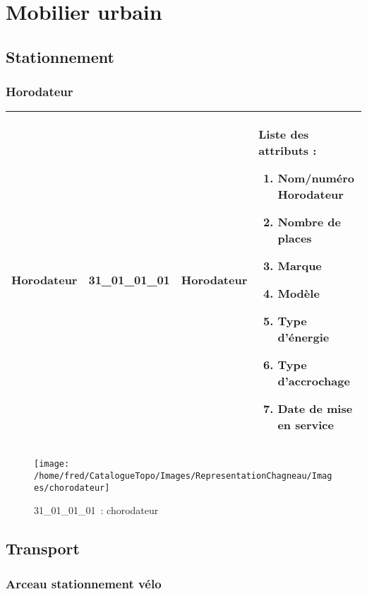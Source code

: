 \documentclass[12pt,titlepage]{book}
\begin{document}
\chapter{Mobilier urbain}
\section{\large Stationnement}
\subsection{Horodateur}
\noindent
\vspace{\baselineskip}

\renewcommand{\arraystretch}{1.2}
\begin{supertabular}{|p{10cm}|c|p{13cm}|p{12cm}|}
 Horodateur & 31\_01\_01\_01 & Horodateur & Liste des attributs :
\begin{enumerate}
  \item Nom/numéro Horodateur  \item Nombre de places  \item Marque  \item Modèle  \item Type d'énergie  \item Type d'accrochage  \item Date de mise en service\end{enumerate}
\\
\hline
\end{supertabular}
\begin{figure}[h!]
  \hfill         %
  \begin{minipage}[t]{3cm}
    \begin{center}
      \texttt{[image: /home/fred/CatalogueTopo/Images/RepresentationChagneau/Images/chorodateur]}
      \caption[~31\_01\_01\_01]{\small{31\_01\_01\_01~:} \tiny{chorodateur}}\label{chorodateur}
    \end{center}
  \end{minipage}
\end{figure}

\section{\large Transport}
\subsection{Arceau stationnement vélo}
\noindent
\vspace{\baselineskip}
\end{document}
